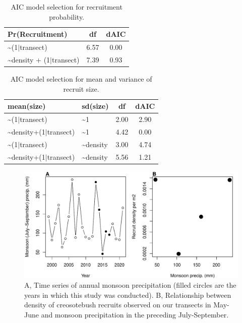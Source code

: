 \documentclass[11pt]{article}\usepackage[]{graphicx}\usepackage[]{color}
\begin{document}
\begin{table}[ht]
\centering
\begin{tabular}{|p{8cm}|c|c|}
  \hline
Pr(Recruitment) & df & dAIC \\ 
  \hline
\~{}(1$|$transect) & 6.57 & 0.00 \\ 
  \~{}density + (1$|$transect) & 7.39 & 0.93 \\ 
   \hline
\end{tabular}
\caption{AIC model selection for recruitment probability.} 
\label{tab:recruit_aic}
\end{table}


\begin{table}[ht]
\centering
\begin{tabular}{|p{8cm}|p{4cm}|c|c|}
  \hline
mean(size) & sd(size) & df & dAIC \\ 
  \hline
\~{}(1$|$transect) & \~{}1 & 2.00 & 2.90 \\ 
  \~{}density+(1$|$transect) & \~{}1 & 4.42 & 0.00 \\ 
  \~{}(1$|$transect) & \~{}density & 3.00 & 4.74 \\ 
  \~{}density+(1$|$transect) & \~{}density & 5.56 & 1.21 \\ 
   \hline
\end{tabular}
\caption{AIC model selection for mean and variance of recruit size.} 
\label{tab:recruitsize_aic}
\end{table}


\newpage
\begin{figure}[H]
  \begin{center}
    \includegraphics[width=\linewidth]{Figures/monsoon_seedlings}
  \caption{A, Time series of annual monsoon precipitation (filled circles are the years in which this study was conducted). B, Relationship between density of creosotebush recruits observed on our transects in May-June and monsoon precipitation in the preceding July-September.}
  \label{fig:monsoon}
  \end{center}
\end{figure}
\end{document}
